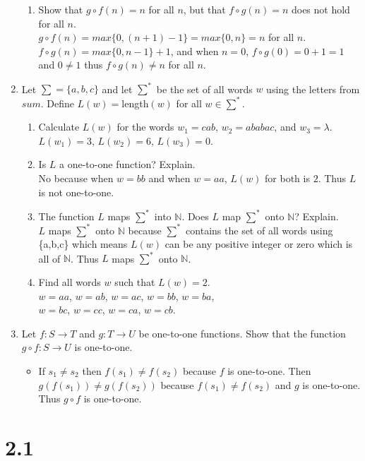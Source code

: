 \documentclass{article}
\newcommand{\N}{\mathbb{N}}
\begin{document}
\begin{enumerate}
\begin{enumerate}
	\item Show that $g\circ f(n)=n$ for all $n$, but that $f\circ g(n)=n$ does not hold for all $n$.\\
	$g\circ f(n) = max\{0,(n+1)-1\} = max\{0,n\} = n$ for all $n$.\\
	$f\circ g(n) = max\{0,n-1\} + 1$, and when $n=0$, $f\circ g(0)=0+1=1$ and $0\not=1$ thus 
	$f\circ g(n)\not=n$ for all $n$.
	\end{enumerate}
\item Let $\sum =\{a,b,c\}$ and let $\sum^\ast$ be the set of all words $w$ using the letters from $sum$. Define $L(w)=$length$(w)$ for all $w \in \sum^\ast$.
	\begin{enumerate}
	\item Calculate $L(w)$ for the words $w_1=cab$, $w_2=ababac$, and $w_3=\lambda$.\\
	$L(w_1)=3$, $L(w_2)=6$, $L(w_3)=0$.
	\item Is $L$ a one-to-one function? Explain.\\
	No because when $w=bb$ and when $w=aa$, $L(w)$ for both is $2$. Thus $L$ is not one-to-one.
	\item The function $L$ maps $\sum^\ast$ into $\N$. Does $L$ map $\sum^\ast$ onto $\N$? Explain.\\
	$L$ maps $\sum^\ast$ onto $\N$ because $\sum^\ast$ contains the set of all words using \{a,b,c\} 
	which means $L(w)$ can be any positive integer or zero which is all of $\N$. Thus $L$ maps 
	$\sum^\ast$ onto $\N$.
	\item Find all words $w$ such that $L(w)=2$.\\
	$w=aa$, $w=ab$, $w=ac$, $w=bb$, $w=ba$,\\$w=bc$, $w=cc$, $w=ca$, $w=cb$.
	\end{enumerate}
\setcounter{enumi}{12}
\item Let $f : S\to T$ and $g: T\to U$ be one-to-one functions. Show that the function $g\circ f: S\to U$ is one-to-one.
	\begin{itemize}
	\item If $s_1\not=s_2$ then $f(s_1)\not=f(s_2)$ because $f$ is one-to-one. Then $g(f(s_1))\not=
	g(f(s_2))$ because $f(s_1)\not=f(s_2)$ and $g$ is one-to-one. Thus $g\circ f$ is one-to-one.
	\end{itemize}
\end{enumerate}

\section*{2.1} %
\end{document}
